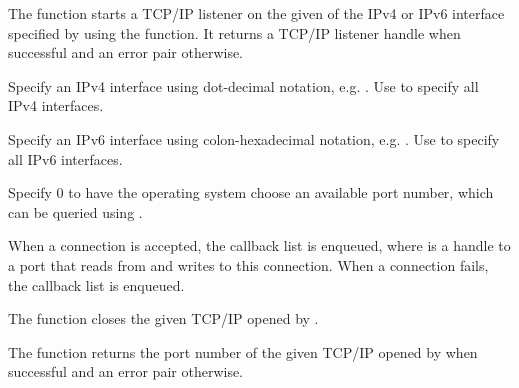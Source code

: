 \begin{function}
\end{function}

The  function starts a TCP/IP listener on the
given  of the IPv4 or IPv6 interface specified by
 using the  function. It returns a
TCP/IP listener handle when successful and an error pair otherwise.

Specify an IPv4 interface  using dot-decimal notation,
e.g. . Use  to specify all IPv4
interfaces.

Specify an IPv6 interface  using colon-hexadecimal
notation, e.g. . Use \code{::} to specify all IPv6
interfaces.

Specify  0 to have the operating system choose an available
port number, which can be queried using
.

When a connection is accepted, the callback list
 is enqueued, where  is a
handle to a port that reads from and writes to this connection. When a
connection fails, the callback list  is enqueued.

\begin{function}
\end{function}

The  function closes the given TCP/IP
 opened by .

\begin{function}
\end{function}

The  function returns the port
number of the given TCP/IP  opened by
 when successful and an error pair otherwise.

\begin{function}
\end{function}

